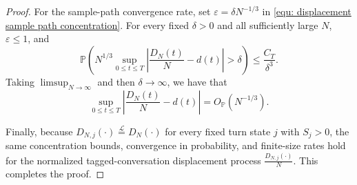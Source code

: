 \documentclass[10pt,a4paper]{amsart}
\newcommand{\pro}{\mathbb P}
\begin{document}
\begin{proof}
    For the sample-path convergence rate, set $\varepsilon=\delta N^{-1/3}$ in \eqref{equ: displacement sample path concentration}. For every fixed $\delta>0$ and all sufficiently large $N$, $\varepsilon\leq 1$, and
    \begin{equation*}
        \pro\left(N^{1/3}\sup_{0\leq t\leq T}\left|\frac{D_N(t)}{N}-d(t)\right|>\delta\right)\leq\frac{C_T}{\delta^3}.
    \end{equation*}
    Taking $\limsup_{N\to\infty}$ and then $\delta\to\infty$, we have that
    \begin{equation*}
        \sup_{0\leq t\leq T}\left|\frac{D_N(t)}{N}-d(t)\right|=O_{\mathbb P}(N^{-1/3}).
    \end{equation*}

    Finally, because $D_{N,j}(\cdot)\stackrel{\mathcal L}{=}D_N(\cdot)$ for every fixed turn state $j$ with $S_j>0$, the same concentration bounds, convergence in probability, and finite-size rates hold for the normalized tagged-conversation displacement process $\frac{D_{N,j}(\cdot)}{N}$. This completes the proof.
\end{proof}
\end{document}
